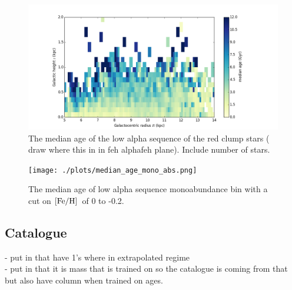 \documentclass[12pt, preprint]{aastex}
\newcommand{\feh}{\mbox{$\rm [Fe/H]$}}
\begin{document}
\begin{figure}[p!]
\centering
    \includegraphics[scale=0.45]{./plots/median_age_low_alpha_abs.png}
    \caption{The median age of the low alpha sequence of the red clump stars ( draw where this in in feh alphafeh plane). Include number of stars. }
\label{fig:redclump_low}
\vspace{-30pt}
\end{figure}


\begin{figure}[p!]
\centering
    \texttt{[image: ./plots/median\_age\_mono\_abs.png]}
    \caption{The median age of low alpha sequence monoabundance  bin with a cut on  \feh\ of 0 to -0.2. }
\label{fig:redclump_mono}
\end{figure}


\subsection{Catalogue}

- put in that have 1's where in extrapolated regime \\
- put in that it is mass that is trained on so the catalogue is coming from that but also have column when trained on ages. \\



\end{document}
